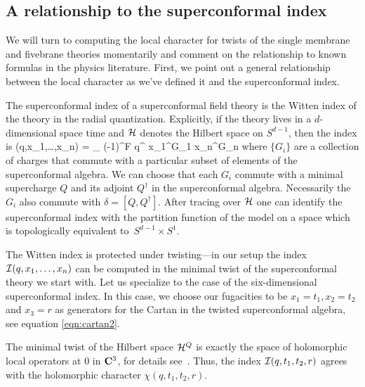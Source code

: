 \subsection{A relationship to the superconformal index}
\label{sec:sucaindex}
We will turn to computing the local character for twists of the single membrane and fivebrane theories momentarily and comment on the relationship to known formulas in the physics literature. 
First, we point out a general relationship between the local character as we've defined it and the superconformal index. 

The superconformal index of a superconformal field theory is the Witten index of the theory in the radial quantization.
Explicitly, if the theory lives in a $d$-dimensional space time and $\mathcal H$ denotes the Hilbert space on $S^{d-1}$, then the index is
\beqn
\cI(q,x_1,\ldots,x_n) = \Tr_{\cH} (-1)^F q^{\delta} x_1^{G_1} \cdots x_n^{G_n} 
\eeqn
where $\{G_i\}$ are a collection of charges that commute with a particular subset of elements of the superconformal algebra. 
We can choose that each $G_i$ commute with a minimal supercharge $Q$ and its adjoint $Q^{\dagger}$ in the superconformal algebra.
Necessarily the $G_i$ also commute with $\delta = [Q,Q^{\dagger}]$.
After tracing over $\mathcal H$ one can identify the superconformal index with the partition function of the model on a space which is topologically equivalent to~$S^{d-1} \times S^1$.

The Witten index is protected under twisting---in our setup the index $\mathcal I(q,x_1,\ldots,x_n)$ can be computed in the minimal twist of the superconformal theory we start with.
Let us specialize to the case of the six-dimensional superconformal index. 
In this case, we choose our fugacities to be $x_1 = t_1, x_2 = t_2$ and $x_3 = r$ as generators for the Cartan in the twisted superconformal algebra, see equation \eqref{eqn:cartan2}. 

The minimal twist of the Hilbert space $\mathcal H^Q$ is exactly the space of holomorphic local operators at $0$ in $\mathbf{C}^3$, for details see~\cite{SWchar}. 
Thus, the index $\mathcal I(q,t_1,t_2,r)$ agrees with the holomorphic character $\chi(q,t_1,t_2,r)$.

